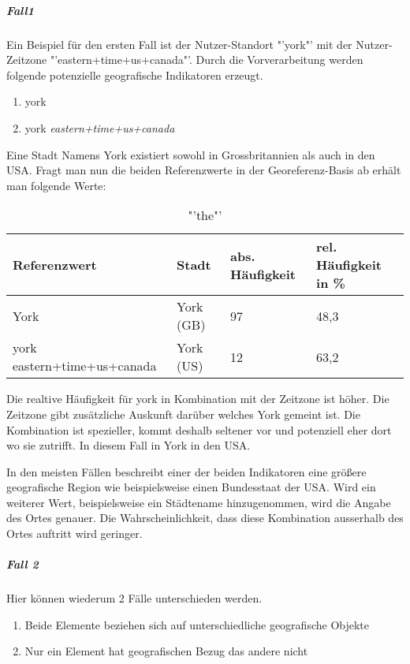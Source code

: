					\subparagraph{Fall1} 

						Ein Beispiel für den ersten Fall ist der Nutzer-Standort "'york"' mit der Nutzer-Zeitzone "'eastern+time+us+canada"'. 
						Durch die Vorverarbeitung werden folgende potenzielle geografische Indikatoren erzeugt.
						\begin{enumerate}		
							\item york
							\item york \textit{eastern+time+us+canada}
						\end{enumerate}		

						Eine Stadt Namens York existiert sowohl in Grossbritannien als auch in den USA.
						Fragt man nun die beiden Referenzwerte in der Georeferenz-Basis ab erhält man folgende Werte:

							\begin{table}[h]
								\centering
									\caption{"'the"'}
									\label{tab:the}
									\begin{tabular}{|l|l|l|l|}
									\hline
									Referenzwert 				& Stadt  	& abs. Häufigkeit & rel. Häufigkeit in \% \\ \hline \hline
									York          				& York (GB) & 97              & 48,3       \\ \hline
									york eastern+time+us+canada & York (US) & 12              & 63,2        \\ \hline
									\end{tabular}
							\end{table}

							Die realtive Häufigkeit für york in Kombination mit der Zeitzone ist höher. 
							Die Zeitzone gibt zusätzliche Auskunft darüber welches York gemeint ist. 
							Die Kombination ist spezieller, kommt deshalb seltener vor und potenziell eher dort wo sie zutrifft. 
							In diesem Fall in York in den USA. 

							In den meisten Fällen beschreibt einer der beiden Indikatoren eine größere geografische Region wie beispielsweise einen Bundesstaat der USA.
							Wird ein weiterer Wert, beispielsweise ein Städtename hinzugenommen, wird die Angabe des Ortes genauer. 
							Die Wahrscheinlichkeit, dass diese Kombination ausserhalb des Ortes auftritt wird geringer. 

					\subparagraph{Fall 2}

						Hier können wiederum 2 Fälle unterschieden werden.

						\begin{enumerate}
							\item Beide Elemente beziehen sich auf unterschiedliche geografische Objekte
							\item Nur ein Element hat geografischen Bezug das andere nicht 
						\end{enumerate}

